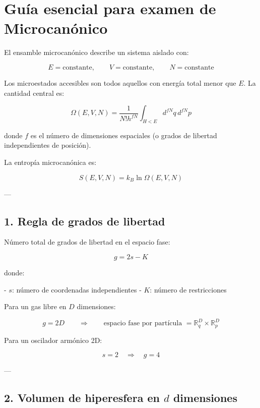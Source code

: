 \documentclass{article}
\begin{document}

\section*{\textcolor{Tarawera}{\textbf{Guía esencial para examen de Microcanónico}}}

El ensamble microcanónico describe un sistema aislado con:

\[
E = \text{constante},\qquad V = \text{constante},\qquad N = \text{constante}
\]

Los microestados accesibles son todos aquellos con energía total menor que \(E\).
La cantidad central es:

\[
\boxed{
\Omega(E,V,N) = \frac{1}{N! h^{fN}} \int_{H<E} d^{fN}q\, d^{fN}p
}
\]

donde \(f\) es el número de dimensiones espaciales 
(o grados de libertad independientes de posición).

La entropía microcanónica es:

\[
\boxed{
S(E,V,N) = k_{B}\ln \Omega(E,V,N)
}
\]

---

\subsection*{\textcolor{Apple Green}{1. Regla de grados de libertad}}

Número total de grados de libertad en el espacio fase:

\[
\boxed{
g = 2s - K
}
\]

donde:

- \(s\): número de coordenadas independientes  
- \(K\): número de restricciones

Para un gas libre en \(D\) dimensiones:

\[
g = 2D
\qquad\Rightarrow\qquad
\text{espacio fase por partícula } = \mathbb{R}^{D}_{q} \times \mathbb{R}^{D}_{p}
\]

Para un oscilador armónico 2D:

\[
s = 2\quad\Rightarrow\quad g = 4
\]

---

\subsection*{\textcolor{Apple Green}{2. Volumen de hiperesfera en \(d\) dimensiones}}
\end{document}
